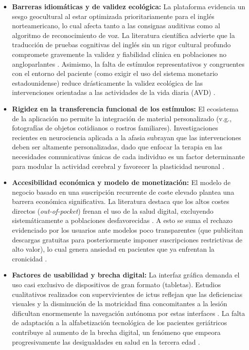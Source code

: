 \begin{itemize}
    \item \textbf{Barreras idiomáticas y de validez ecológica:} La plataforma evidencia un sesgo geocultural al estar optimizada prioritariamente para el inglés norteamericano, lo cual afecta tanto a las consignas auditivas como al algoritmo de reconocimiento de voz. La literatura científica advierte que la traducción de pruebas cognitivas del inglés sin un rigor cultural profundo compromete gravemente la validez y fiabilidad clínica en poblaciones no angloparlantes \cite{dort2020_aphasia}. Asimismo, la falta de estímulos representativos y congruentes con el entorno del paciente (como exigir el uso del sistema monetario estadounidense) reduce drásticamente la validez ecológica de las intervenciones orientadas a las actividades de la vida diaria (AVD) \cite{ellis2022_representation}.
    
    \item \textbf{Rigidez en la transferencia funcional de los estímulos:} El ecosistema de la aplicación no permite la integración de material personalizado (v.g., fotografías de objetos cotidianos o rostros familiares). Investigaciones recientes en neurociencia aplicada a la afasia subrayan que las intervenciones deben ser altamente personalizadas, dado que enfocar la terapia en las necesidades comunicativas únicas de cada individuo es un factor determinante para modular la actividad cerebral y favorecer la plasticidad neuronal \cite{neuroscience_ai_2026}.
    
    \item \textbf{Accesibilidad económica y modelo de monetización:} El modelo de negocio basado en una suscripción recurrente de coste elevado plantea una barrera económica significativa. La literatura destaca que los altos costes directos (\textit{out-of-pocket}) frenan el uso de la salud digital, excluyendo sistemáticamente a poblaciones desfavorecidas \cite{stroke_equity_2021}. A esto se suma el rechazo evidenciado por los usuarios ante modelos poco transparentes (que publicitan descargas gratuitas para posteriormente imponer suscripciones restrictivas de alto valor), lo cual genera ansiedad en pacientes que ya enfrentan la cronicidad \cite{stroke_qualitative_2025}.
    
    \item \textbf{Factores de usabilidad y brecha digital:} La interfaz gráfica demanda el uso casi exclusivo de dispositivos de gran formato (tabletas). Estudios cualitativos realizados con supervivientes de ictus reflejan que las deficiencias visuales y la disminución de la motricidad fina concomitantes a la lesión dificultan enormemente la navegación autónoma por estas interfaces \cite{stroke_qualitative_2025}. La falta de adaptación a la alfabetización tecnológica de los pacientes geriátricos contribuye al aumento de la brecha digital, un fenómeno que empeora progresivamente las desigualdades en salud en la tercera edad \cite{jmir_digitaldivide_2025}.
\end{itemize}

